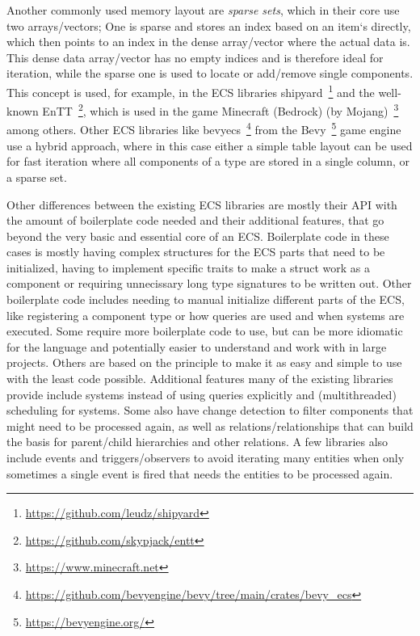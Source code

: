 Another commonly used memory layout are \textit{sparse sets}, which in their core use two arrays/vectors; One is sparse and stores an index based on an item`s directly, which then points to an index in the dense array/vector where the actual data is. This dense data array/vector has no empty indices and is therefore ideal for iteration, while the sparse one is used to locate or add/remove single components. This concept is used, for example, in the ECS libraries \textsf{shipyard}~\footnote{\url{https://github.com/leudz/shipyard}} and the well-known \textsf{EnTT}~\footnote{\url{https://github.com/skypjack/entt}}, which is used in the game \textsf{Minecraft (Bedrock)} (by Mojang)~\footnote{\url{https://www.minecraft.net}} among others. Other ECS libraries like \textsf{bevy\textunderscore ecs}~\footnote{\url{https://github.com/bevyengine/bevy/tree/main/crates/bevy_ecs}} from the \textsf{Bevy}~\footnote{\url{https://bevyengine.org/}} game engine use a hybrid approach, where in this case either a simple table layout can be used for fast iteration where all components of a type are stored in a single column, or a sparse set.

Other differences between the existing ECS libraries are mostly their API with the amount of boilerplate code needed and their additional features, that go beyond the very basic and essential core of an ECS. Boilerplate code in these cases is mostly having complex structures for the ECS parts that need to be initialized, having to implement specific traits to make a struct work as a component or requiring unnecissary long type signatures to be written out. Other boilerplate code includes needing to manual initialize different parts of the ECS, like registering a component type or how queries are used and when systems are executed. Some require more boilerplate code to use, but can be more idiomatic for the language and potentially easier to understand and work with in large projects. Others are based on the principle to make it as easy and simple to use with the least code possible. Additional features many of the existing libraries provide include systems instead of using queries explicitly and (multithreaded) scheduling for systems. Some also have change detection to filter components that might need to be processed again, as well as relations/relationships that can build the basis for parent/child hierarchies and other relations. A few libraries also include events and triggers/observers to avoid iterating many entities when only sometimes a single event is fired that needs the entities to be processed again.

